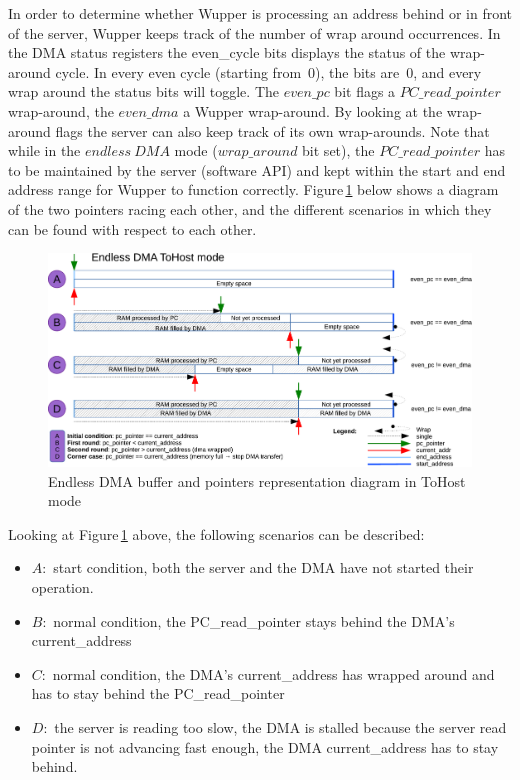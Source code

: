 In order to determine whether Wupper is processing an address behind or in front of the server, Wupper keeps track of the number of wrap around occurrences. In the DMA status registers the even\_cycle bits displays the status of the wrap-around cycle. In every even cycle (starting from~0), the bits are~0, and every wrap around the status bits will toggle. The $even\_pc$ bit flags a $PC\_read\_pointer$ wrap-around, the $even\_dma$ a Wupper wrap-around. By looking at the wrap-around flags the server can also keep track of its own wrap-arounds. Note that while in the $endless\ DMA$ mode ($wrap\_around$ bit set), the $PC\_read\_pointer$ has to be maintained by the server (software API) and kept within the start and end address range for Wupper to function correctly. Figure\,\ref{fig:endless_dma_diagram_tohost} below shows a diagram of the two pointers racing each other, and the different scenarios in which they can be found with respect to each other.
\newpage
\begin{figure}[H]
\centering
\includegraphics[width=1\textwidth, page=1]{figures/Endless_DMA_diagram.pdf}
\caption{Endless DMA buffer and pointers representation diagram in ToHost mode}
\label{fig:endless_dma_diagram_tohost}
\end{figure}

Looking at Figure\,\ref{fig:endless_dma_diagram_tohost} above, the following scenarios can be described:
\begin{itemize}\itemsep-5pt
	\item $A:$ start condition, both the server and the DMA have not started their operation.
	\item $B:$ normal condition, the PC\_read\_pointer stays behind the DMA's current\_address
	\item $C:$ normal condition, the DMA's current\_address has wrapped around and has to stay behind the PC\_read\_pointer
	\item $D:$ the server is reading too slow, the DMA is stalled because the server read pointer is not advancing fast enough, the DMA current\_address has to stay behind.
\end{itemize}

